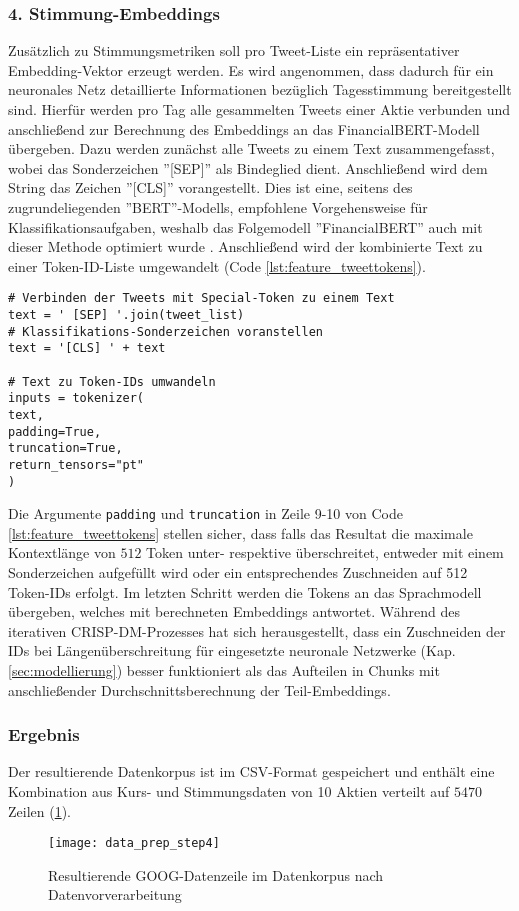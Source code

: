 \subsubsection*{4. Stimmung-Embeddings}
Zusätzlich zu Stimmungsmetriken soll pro Tweet-Liste ein repräsentativer Embedding-Vektor erzeugt werden. Es wird angenommen, dass dadurch für ein neuronales Netz detaillierte Informationen bezüglich Tagesstimmung bereitgestellt sind. Hierfür werden pro Tag alle gesammelten Tweets einer Aktie verbunden und anschließend zur Berechnung des Embeddings an das FinancialBERT-Modell übergeben.
Dazu werden zunächst alle Tweets zu einem Text zusammengefasst, wobei das Sonderzeichen ''[SEP]'' als Bindeglied dient. Anschließend wird dem String das Zeichen ''[CLS]'' vorangestellt. Dies ist eine, seitens des zugrundeliegenden ''BERT''-Modells, empfohlene Vorgehensweise für Klassifikationsaufgaben, weshalb das Folgemodell ''FinancialBERT'' auch mit dieser Methode optimiert wurde \autocite[Kap. 5.3]{hazourli2022financialbert}.
Anschließend wird der kombinierte Text zu einer Token-ID-Liste umgewandelt (Code \ref{lst:feature_tweettokens}). 
\begin{lstlisting}[caption={Umwandlung von Tweets zu Token-IDs}, label=lst:feature_tweettokens, captionpos=t]
# Verbinden der Tweets mit Special-Token zu einem Text
text = ' [SEP] '.join(tweet_list)
# Klassifikations-Sonderzeichen voranstellen
text = '[CLS] ' + text

# Text zu Token-IDs umwandeln
inputs = tokenizer(
text, 
padding=True, 
truncation=True, 
return_tensors="pt"
)
\end{lstlisting}
Die Argumente \texttt{padding} und \texttt{truncation} in Zeile 9-10 von Code \ref{lst:feature_tweettokens} stellen sicher, dass falls das Resultat die maximale Kontextlänge von $512$ Token unter- respektive überschreitet, entweder mit einem Sonderzeichen aufgefüllt wird oder ein entsprechendes Zuschneiden auf 512 Token-IDs erfolgt.
Im letzten Schritt werden die Tokens an das Sprachmodell übergeben, welches mit berechneten Embeddings antwortet.
Während des iterativen \ac{CRISP-DM}-Prozesses hat sich herausgestellt, dass ein Zuschneiden der IDs bei Längenüberschreitung für eingesetzte neuronale Netzwerke (Kap. \ref{sec:modellierung}) besser funktioniert als das Aufteilen in Chunks mit anschließender Durchschnittsberechnung der Teil-Embeddings.

\subsubsection*{Ergebnis}
Der resultierende Datenkorpus ist im \ac{CSV}-Format gespeichert und enthält eine Kombination aus Kurs- und Stimmungsdaten von 10 Aktien verteilt auf $5470$ Zeilen (\ref{fig:data_prep_step4}).
\begin{figure}[H]
	\texttt{[image: data\_prep\_step4]}
	\caption{Resultierende GOOG-Datenzeile im Datenkorpus nach Datenvorverarbeitung}
	\label{fig:data_prep_step4}
\end{figure}





